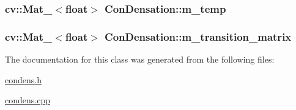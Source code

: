 \label{classConDensation_ace037712799e93339a0146a5f2891e35}
\hypertarget{classConDensation_a3908e7f2187a4b0010fadff24b950130}{
\subsubsection[{m\_\-temp}]{\setlength{\rightskip}{0pt plus 5cm}cv::Mat\_\-$<$float$>$ {\bf ConDensation::m\_\-temp}}}
\label{classConDensation_a3908e7f2187a4b0010fadff24b950130}
\hypertarget{classConDensation_a4aef4dc8a1246b56ca4996cddb4ddebf}{
\subsubsection[{m\_\-transition\_\-matrix}]{\setlength{\rightskip}{0pt plus 5cm}cv::Mat\_\-$<$float$>$ {\bf ConDensation::m\_\-transition\_\-matrix}}}
\label{classConDensation_a4aef4dc8a1246b56ca4996cddb4ddebf}


The documentation for this class was generated from the following files:\begin{DoxyCompactItemize}
\item 
\hyperlink{condens_8h}{condens.h}\item 
\hyperlink{condens_8cpp}{condens.cpp}\end{DoxyCompactItemize}
